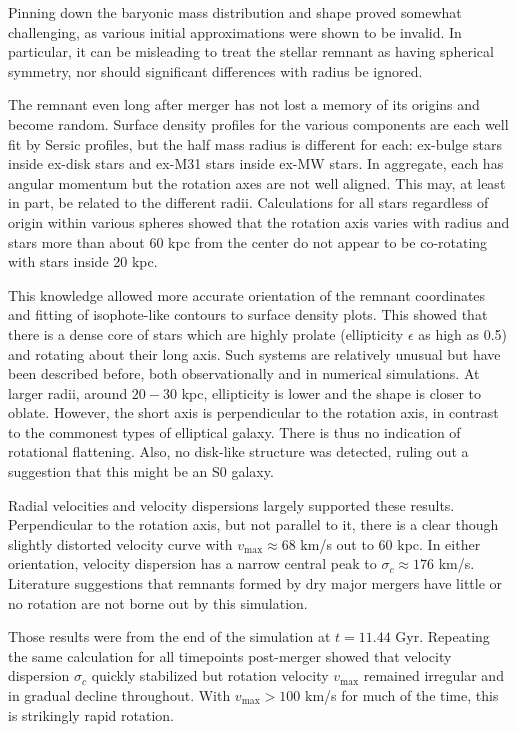 \documentclass[twocolumn]{aastex63}
\begin{document}
Pinning down the baryonic mass distribution and shape proved somewhat challenging, as various initial approximations were shown to be invalid. In particular, it can be misleading to treat the stellar remnant as having spherical symmetry, nor should significant differences with radius be ignored.

The remnant even long after merger has not lost a memory of its origins and become random. Surface density profiles for the various components are each well fit by Sersic profiles, but the half mass radius is different for each: ex-bulge stars inside ex-disk stars and ex-M31 stars inside ex-MW stars. In aggregate, each has angular momentum but the rotation axes are not well aligned. This may, at least in part, be related to the different radii. Calculations for all stars regardless of origin within various spheres showed that the rotation axis varies with radius and stars more than about 60 kpc from the center do not appear to be co-rotating with stars inside 20 kpc.

This knowledge allowed more accurate orientation of the remnant coordinates and fitting of isophote-like contours to surface density plots. This showed that there is a dense core of stars which are highly prolate (ellipticity $\epsilon$ as high as 0.5) and rotating about their long axis. Such systems are relatively unusual but have been described before, both observationally and in numerical simulations. At larger radii, around $20-30$ kpc, ellipticity is lower and the shape is closer to oblate. However, the short axis is perpendicular to the rotation axis, in contrast to the commonest types of elliptical galaxy. There is thus no indication of rotational flattening. Also, no disk-like structure was detected, ruling out a suggestion that this might be an S0 galaxy.

Radial velocities and velocity dispersions largely supported these results. Perpendicular to the rotation axis, but not parallel to it, there is a clear though slightly distorted velocity curve with $v_{\text{max}} \approx 68$ km/s out to 60 kpc. In either orientation, velocity dispersion has a narrow central peak to $\sigma_c \approx 176$ km/s. Literature suggestions that remnants formed by dry major mergers have little or no rotation are not borne out by this simulation.

Those results were from the end of the simulation at $t=11.44$ Gyr. Repeating the same calculation for all timepoints post-merger showed that velocity dispersion $\sigma_c$ quickly stabilized but rotation velocity $v_{\text{max}}$ remained irregular and in gradual decline throughout. With $v_{\text{max}} > 100$ km/s for much of the time, this is strikingly rapid rotation.
\end{document}
